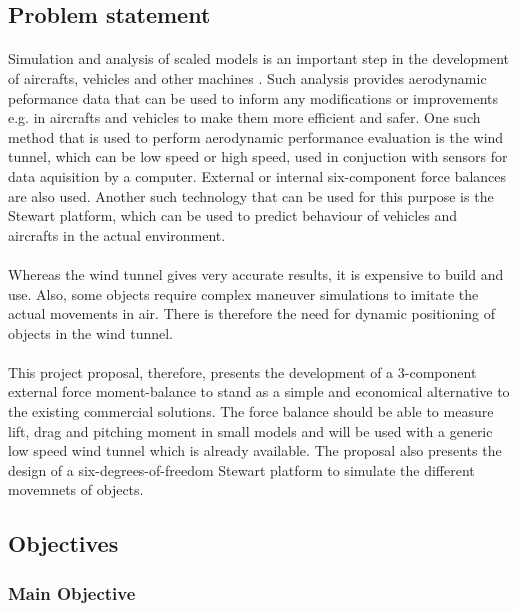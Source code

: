 \subsection{Problem statement}
\paragraph{}Simulation and analysis of scaled models is an important step in the development of aircrafts, vehicles and other machines . Such analysis provides aerodynamic peformance data that can be used to inform any modifications or improvements e.g. in aircrafts and vehicles to make them more efficient and safer. One such method that is used to perform aerodynamic performance evaluation is the wind tunnel, which can be low speed or high speed, used in conjuction with sensors for data aquisition by a computer. External or internal six-component force balances are also used. Another such technology that can be used for this purpose is the Stewart platform, which can be used to predict behaviour of vehicles and aircrafts in the actual environment.
\paragraph{}Whereas the wind tunnel gives very accurate results, it is expensive to build and use. Also, some objects require complex maneuver simulations to imitate the actual movements in air. There is therefore the need for dynamic positioning of objects in the wind tunnel.

\paragraph{}This project proposal, therefore, presents the development of a 3-component external force moment-balance to stand as a simple and economical alternative to the existing commercial solutions. The force balance should be able to measure lift, drag and pitching moment in small models and will be used with a generic low speed wind tunnel which is already available. The proposal also presents the design of a six-degrees-of-freedom Stewart platform to simulate the different movemnets of objects.
\subsection{Objectives}
\subsubsection{Main Objective}
